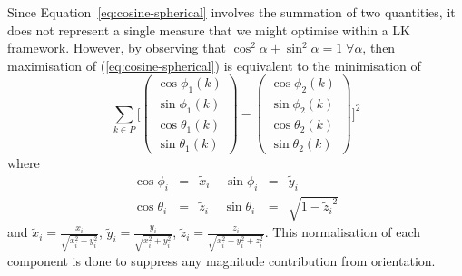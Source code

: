 Since Equation~\ref{eq:cosine-spherical} involves the summation of two quantities, it does not represent a single measure that we might optimise within a LK framework. However, by observing that $\cos^2 \alpha + \sin^2 \alpha = 1 \; \forall \alpha$, then maximisation of (\ref{eq:cosine-spherical}) is equivalent to the minimisation of
\begin{equation}\label{eq:minimise-spherical}
       \sum_{k \in P} \Big[ 
        \begin{pmatrix}
            \cos \phi_1 (k) \\ 
            \sin \phi_1 (k) \\
            \cos \theta_1 (k) \\ 
            \sin \theta_1 (k)
        \end{pmatrix}
        -
        \begin{pmatrix}
            \cos \phi_2 (k) \\ 
            \sin \phi_2 (k) \\
            \cos \theta_2 (k) \\ 
            \sin \theta_2 (k)
        \end{pmatrix}
        \Big] ^2
\end{equation}
where
\begin{equation}
    \begin{aligned}\label{eq:normalised-spherical}
        \cos \phi_i   &=& \tilde{x}_i \;\;\;\; \sin \phi_i   &=& \tilde{y}_i \\
        \cos \theta_i &=& \tilde{z}_i \;\;\;\; \sin \theta_i &=& \sqrt{1 - {\tilde{z}_i}^2}
    \end{aligned}
\end{equation}
and $\tilde{x}_i = \frac{x_i}{\sqrt{x_i^2 + y_i^2}}$, $\tilde{y}_i = \frac{y_i}{\sqrt{x_i^2 + y_i^2}}$, $\tilde{z}_i = \frac{z_i}{\sqrt{x_i^2 + y_i^2 + z_i^2}}$. This normalisation of each component is done to suppress any magnitude contribution from orientation.
